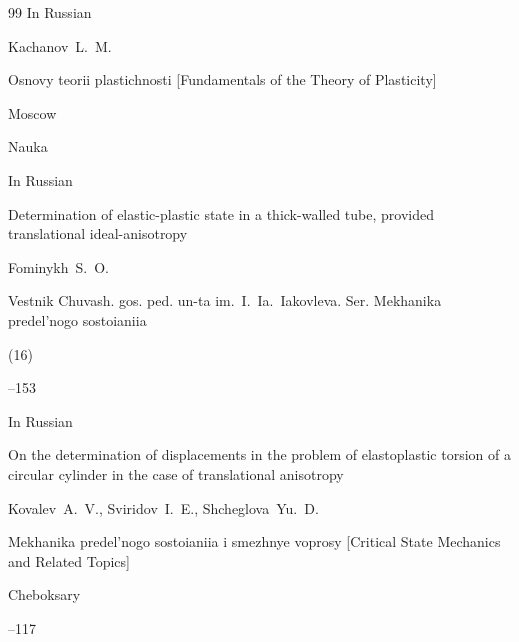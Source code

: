 \begin{thebibliography}{99}
\lang In Russian

\by Kachanov~L.~M.

\book Osnovy teorii plastichnosti \rm [Fundamentals of the Theory of Plasticity]

\publaddr Moscow

\publ Nauka










\lang In Russian

\paper Determination of elastic-plastic state in a thick-walled tube, provided translational ideal-anisotropy

\by Fominykh~S.~O.

\jour Vestnik Chuvash. gos. ped. un-ta im.~I.~Ia.~Iakovleva. Ser. Mekhanika predel'nogo sostoianiia


(16)

--153




\lang In Russian

\paper On the determination of displacements in the problem of elastoplastic torsion of a circular cylinder in the case of translational anisotropy

\by Kovalev~A.~V., Sviridov~I.~E., Shcheglova~Yu.~D.

\inbook Mekhanika predel'nogo sostoianiia i smezhnye voprosy \rm [Critical State Mechanics and Related Topics]

\publaddr Cheboksary


--117



\end{thebibliography}





\renewcommand{\baselinestretch}{0.9}



%

